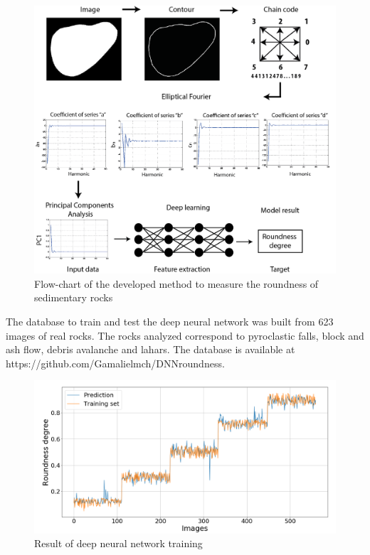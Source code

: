 \documentclass[conference]{IEEEtran}
\begin{document}
\begin{figure}[htbp]
\centerline{\includegraphics[scale=0.6]{fig5.png}}
\caption{Flow-chart of the developed method to measure the roundness of sedimentary rocks}
\label{fig5}
\end{figure}

The database to train and test the deep neural network was built from 623 images of real rocks. The rocks analyzed correspond to pyroclastic falls, block and ash flow, debris avalanche and lahars. The database is available at https://github.com/Gamalielmch/DNN\textunderscore roundness.

\begin{figure}[htbp]
	\centerline{\includegraphics[scale=0.3]{fig6.png}}
	\caption{Result of deep neural network training}
	\label{fig6}
\end{figure}
\end{document}
